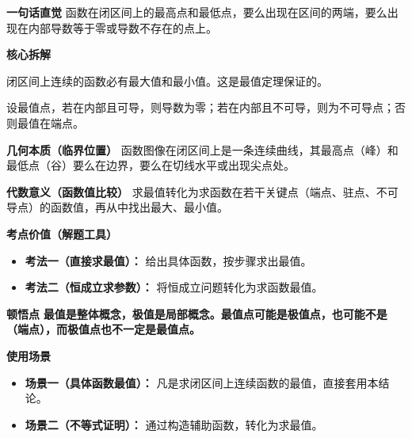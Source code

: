 \begin{explanationbox}
	\textbf{\textcolor{CExplanation}{一句话直觉}}
	函数在闭区间上的最高点和最低点，要么出现在区间的两端，要么出现在内部导数等于零或导数不存在的点上。

	\medskip
	\textbf{\textcolor{CExplanation}{核心拆解}}
	\begin{description}[style=nextline, leftmargin=2.8em, labelsep=0.5em, itemsep=0.45em]
		\item[\textbf{要点一（最值存在性）：}]
			闭区间上连续的函数必有最大值和最小值。这是最值定理保证的。
		\item[\textbf{要点二（分类讨论）：}]
			设最值点，若在内部且可导，则导数为零；若在内部且不可导，则为不可导点；否则最值在端点。
	\end{description}

	\medskip
	\textbf{\textcolor{CExplanation}{几何本质（临界位置）}}
	函数图像在闭区间上是一条连续曲线，其最高点（峰）和最低点（谷）要么在边界，要么在切线水平或出现尖点处。

	\medskip
	\textbf{\textcolor{CExplanation}{代数意义（函数值比较）}}
	求最值转化为求函数在若干关键点（端点、驻点、不可导点）的函数值，再从中找出最大、最小值。

	\medskip
	\textbf{\textcolor{CExplanation}{考点价值（解题工具）}}
	\begin{itemize}[leftmargin=*, itemsep=0.5em, topsep=0.4em]
		\item \textbf{考法一（直接求最值）：} 给出具体函数，按步骤求出最值。
		\item \textbf{考法二（恒成立求参数）：} 将恒成立问题转化为求函数最值。
	\end{itemize}

	\medskip
	\textbf{\textcolor{CExplanation}{顿悟点}}
	\textbf{最值是整体概念，极值是局部概念。最值点可能是极值点，也可能不是（端点），而极值点也不一定是最值点。}

	\medskip
	\textbf{\textcolor{CExplanation}{使用场景}}
	\begin{itemize}[leftmargin=*, itemsep=0.5em, topsep=0.4em]
		\item \textbf{场景一（具体函数最值）：} 凡是求闭区间上连续函数的最值，直接套用本结论。
		\item \textbf{场景二（不等式证明）：} 通过构造辅助函数，转化为求最值。
	\end{itemize}

\end{explanationbox}
